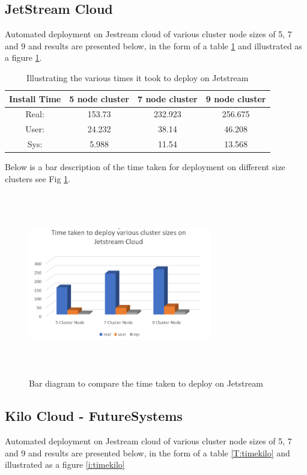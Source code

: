 \documentclass[9pt,twocolumn,twoside]{../../styles/osajnl}
\begin{document}
\subsection{JetStream Cloud}
Automated deployment on Jestream cloud of various cluster node sizes of 5, 7 and 
9 and results are presented below, in the form of a table \ref{T:timejet} and 
illustrated as a figure \ref{i:barjet}.

\begin{table}[!htb]
\centering
\caption{Illustrating the various times it took to deploy on Jetstream}\label{T:timejet}
 \begin{tabular}{|c|| c c c|} 
 \hline
 Install Time &  5 node cluster & 7 node cluster & 9 node cluster\\ [0.5ex]
 \hline\hline
 Real: &153.73 &232.923 & 256.675 \\ 
 \hline
 User: & 24.232 & 38.14 & 46.208 \\
 \hline
 Sys: & 5.988 &11.54 & 13.568  \\
 \hline
\end{tabular}
\end{table}

Below is a bar description of the time taken for deployment on different size 
clusters see Fig \ref{i:barjet}.

\begin{figure}[!htb]
  \includegraphics[width=8cm,height=8cm,keepaspectratio,width=\linewidth]{images/bar-2.png}
  \caption{Bar diagram to compare the time taken to deploy on Jetstream }
  \label{i:barjet}
\end{figure}

\subsection{Kilo Cloud - FutureSystems}
Automated deployment on Jestream cloud of various cluster node sizes of 5, 7 and 
9 and results are presented below, in the form of a table \ref{T:timekilo} and 
illustrated as a figure \ref{i:timekilo}
\end{document}
